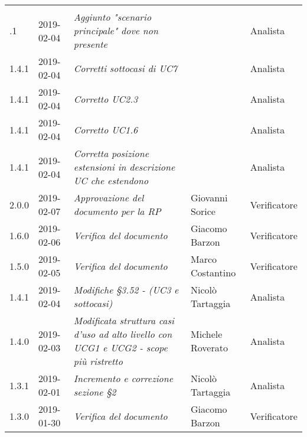 \newpage 
\section*{}
	\begin{longtable}{C{2cm}|C{2.5cm}|C{4.5cm}|C{2.5cm}|C{3cm}}

	 &  &  &  &   \\
	.1 & 2019-02-04 & \emph{Aggiunto "scenario principale" dove non presente} &  & Analista \\
		\hline
	
		1.4.1 & 2019-02-04 & \emph{Corretti sottocasi di UC7} &  & Analista \\
		\hline
	
		1.4.1 & 2019-02-04 & \emph{Corretto UC2.3} &  & Analista \\
		\hline
		
		1.4.1 & 2019-02-04 & \emph{Corretto UC1.6} &  & Analista \\
		\hline
	
	    1.4.1 & 2019-02-04 & \emph{Corretta posizione estensioni in descrizione UC che estendono} &  & Analista \\
	    \hline
	
		2.0.0 & 2019-02-07 & \emph{Approvazione del documento per la RP} & Giovanni Sorice & Verificatore \\
		\hline
	
		1.6.0 & 2019-02-06 & \emph{Verifica del documento} & Giacomo Barzon & Verificatore \\
		\hline
		
		1.5.0 & 2019-02-05 & \emph{Verifica del documento} & Marco Costantino & Verificatore \\
		\hline
	
		1.4.1 & 2019-02-04 & \emph{Modifiche §3.52 -  (UC3 e sottocasi)} & Nicolò Tartaggia & Analista \\
		\hline
	
		1.4.0 & 2019-02-03 & \emph{Modificata struttura casi d'uso ad alto livello con UCG1 e UCG2 - scope più ristretto} & Michele Roverato & Analista \\
		\hline
	
		1.3.1 & 2019-02-01 & \emph{Incremento e correzione sezione §2} & Nicolò Tartaggia & Analista \\
		\hline
	
		1.3.0 & 2019-01-30 & \emph{Verifica del documento} & Giacomo Barzon & Verificatore \\
		\hline
		

\end{longtable}

